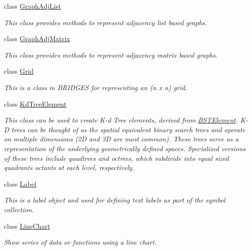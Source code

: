\begin{DoxyCompactItemize}
class \mbox{\hyperlink{classbridges_1_1datastructure_1_1_graph_adj_list}{Graph\+Adj\+List}}
\begin{DoxyCompactList}\small\item\em This class provides methods to represent adjacency list based graphs. \end{DoxyCompactList}\item 
class \mbox{\hyperlink{classbridges_1_1datastructure_1_1_graph_adj_matrix}{Graph\+Adj\+Matrix}}
\begin{DoxyCompactList}\small\item\em This class provides methods to represent adjacency matrix based graphs. \end{DoxyCompactList}\item 
class \mbox{\hyperlink{classbridges_1_1datastructure_1_1_grid}{Grid}}
\begin{DoxyCompactList}\small\item\em This is a class in B\+R\+I\+D\+G\+ES for representing an (n x n) grid. \end{DoxyCompactList}\item 
class \mbox{\hyperlink{classbridges_1_1datastructure_1_1_kd_tree_element}{Kd\+Tree\+Element}}
\begin{DoxyCompactList}\small\item\em This class can be used to create K-\/d Tree elements, derived from \mbox{\hyperlink{classbridges_1_1datastructure_1_1_b_s_t_element}{B\+S\+T\+Element}}. K-\/D trees can be thought of as the spatial equivalent binary search trees and operate on multiple dimensions (2D and 3D are most common). These trees serve as a representation of the underlying geometrically defined spaces. Specialized versions of these trees include quadtrees and octrees, which subdivide into equal sized quadrants octants at each level, respectively. \end{DoxyCompactList}\item 
class \mbox{\hyperlink{classbridges_1_1datastructure_1_1_label}{Label}}
\begin{DoxyCompactList}\small\item\em This is a label object and used for defining text labels as part of the symbol collection. \end{DoxyCompactList}\item 
class \mbox{\hyperlink{classbridges_1_1datastructure_1_1_line_chart}{Line\+Chart}}
\begin{DoxyCompactList}\small\item\em Show series of data or functions using a line chart. \end{DoxyCompactList}\item 

\end{DoxyCompactItemize}
